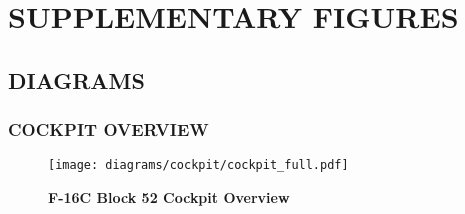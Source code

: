 \appendix
\chapter[SUPP. FIGURES]{SUPPLEMENTARY FIGURES}
\localtableofcontents
\thispagestyle{plain}
\cleardoublepage


\section{DIAGRAMS}

\subsection{COCKPIT OVERVIEW}
\begin{figure}[h]
    \centering
    \texttt{[image: diagrams/cockpit/cockpit\_full.pdf]}
    \caption{\textbf{F-16C Block 52 Cockpit Overview}}
    \label{fig:cockpitoverview}
\end{figure}

\cleardoublepage